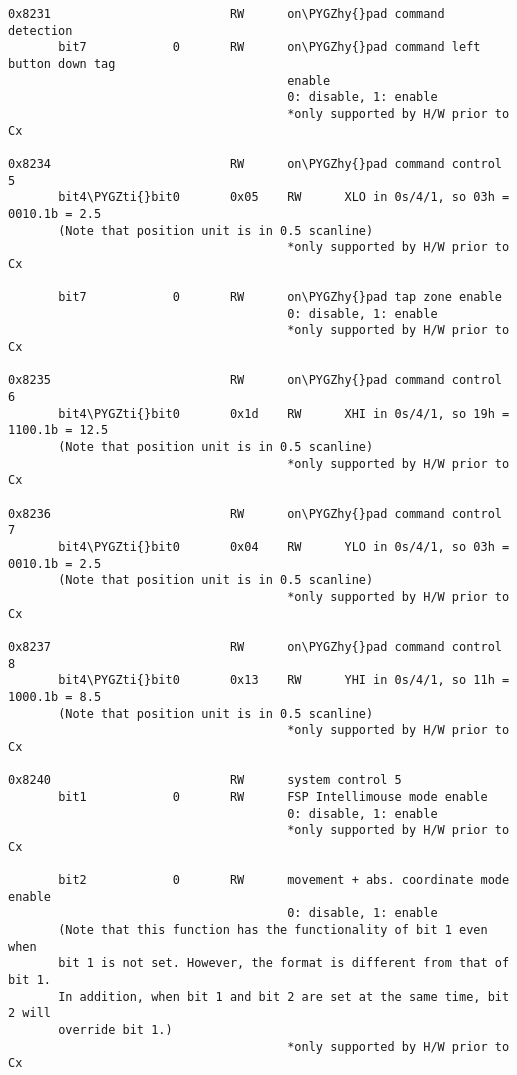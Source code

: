 \documentclass[a4paper,8pt,english]{sphinxmanual}
\def\PYGZhy{\char`\-}
\def\PYGZti{\char`\~}
\begin{document}
\begin{Verbatim}[commandchars=\\\{\}]
0x8231                         RW      on\PYGZhy{}pad command detection
       bit7            0       RW      on\PYGZhy{}pad command left button down tag
                                       enable
                                       0: disable, 1: enable
                                       *only supported by H/W prior to Cx

0x8234                         RW      on\PYGZhy{}pad command control 5
       bit4\PYGZti{}bit0       0x05    RW      XLO in 0s/4/1, so 03h = 0010.1b = 2.5
       (Note that position unit is in 0.5 scanline)
                                       *only supported by H/W prior to Cx

       bit7            0       RW      on\PYGZhy{}pad tap zone enable
                                       0: disable, 1: enable
                                       *only supported by H/W prior to Cx

0x8235                         RW      on\PYGZhy{}pad command control 6
       bit4\PYGZti{}bit0       0x1d    RW      XHI in 0s/4/1, so 19h = 1100.1b = 12.5
       (Note that position unit is in 0.5 scanline)
                                       *only supported by H/W prior to Cx

0x8236                         RW      on\PYGZhy{}pad command control 7
       bit4\PYGZti{}bit0       0x04    RW      YLO in 0s/4/1, so 03h = 0010.1b = 2.5
       (Note that position unit is in 0.5 scanline)
                                       *only supported by H/W prior to Cx

0x8237                         RW      on\PYGZhy{}pad command control 8
       bit4\PYGZti{}bit0       0x13    RW      YHI in 0s/4/1, so 11h = 1000.1b = 8.5
       (Note that position unit is in 0.5 scanline)
                                       *only supported by H/W prior to Cx

0x8240                         RW      system control 5
       bit1            0       RW      FSP Intellimouse mode enable
                                       0: disable, 1: enable
                                       *only supported by H/W prior to Cx

       bit2            0       RW      movement + abs. coordinate mode enable
                                       0: disable, 1: enable
       (Note that this function has the functionality of bit 1 even when
       bit 1 is not set. However, the format is different from that of bit 1.
       In addition, when bit 1 and bit 2 are set at the same time, bit 2 will
       override bit 1.)
                                       *only supported by H/W prior to Cx


\end{Verbatim}
\end{document}
